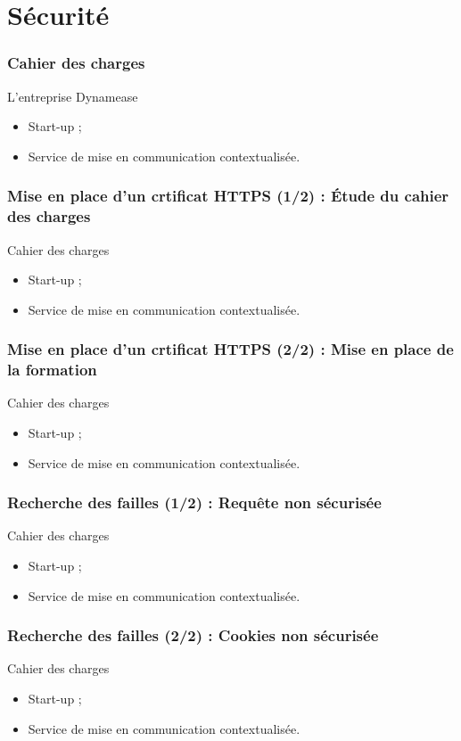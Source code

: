 \section{Sécurité}
\author{Kévin Moreau}


\begin{frame}
	\frametitle{Cahier des charges}

	\begin{block}{L'entreprise Dynamease}
	 \begin{itemize}
      \item Start-up ;
	  \item Service de mise en communication contextualisée.
	 \end{itemize}
	\end{block}
\end{frame}

\begin{frame}
	\frametitle{Mise en place d'un crtificat HTTPS (1/2) : Étude du cahier des charges}

	\begin{block}{Cahier des charges}
	 \begin{itemize}
      \item Start-up ;
	  \item Service de mise en communication contextualisée.
	 \end{itemize}
	\end{block}
\end{frame}

\begin{frame}
	\frametitle{Mise en place d'un crtificat HTTPS (2/2) : Mise en place de la formation}

	\begin{block}{Cahier des charges}
	 \begin{itemize}
      \item Start-up ;
	  \item Service de mise en communication contextualisée.
	 \end{itemize}
	\end{block}
\end{frame}

\begin{frame}
	\frametitle{Recherche des failles (1/2) : Requête non sécurisée}

	\begin{block}{Cahier des charges}
	 \begin{itemize}
      \item Start-up ;
	  \item Service de mise en communication contextualisée.
	 \end{itemize}
	\end{block}
\end{frame}

\begin{frame}
	\frametitle{Recherche des failles (2/2) : Cookies non sécurisée}

	\begin{block}{Cahier des charges}
	 \begin{itemize}
      \item Start-up ;
	  \item Service de mise en communication contextualisée.
	 \end{itemize}
	\end{block}
\end{frame}